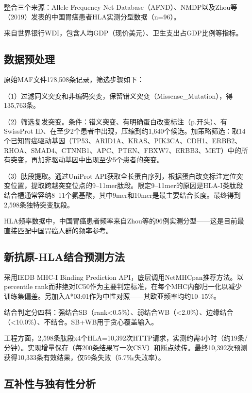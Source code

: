 \documentclass[12pt,a4paper]{ctexart}
\begin{document}
整合三个来源：Allele Frequency Net Database（AFND\cite{ref10}）、NMDP以及Zhou等（2019）\cite{ref9}发表的中国胃癌患者HLA实测分型数据（n=96）。

来自世界银行WDI，包含人均GDP（现价美元）、卫生支出占GDP比例等指标。

\subsection{数据预处理}

原始MAF文件178,508条记录，筛选步骤如下：

（1）过滤同义突变和非编码突变，保留错义突变（Missense\_Mutation），得135,763条。

（2）筛选复发突变。条件：错义突变、有明确蛋白改变标注（p.开头）、有SwissProt ID、在至少2个患者中出现，压缩到约1,640个候选。加策略筛选：取14个已知胃癌驱动基因（TP53、ARID1A、KRAS、PIK3CA、CDH1、ERBB2、RHOA、SMAD4、CTNNB1、APC、PTEN、FBXW7、ERBB3、MET）中的所有突变，再加非驱动基因中出现至少5个患者的突变。

（3）肽段提取。通过UniProt API获取全长蛋白序列，根据蛋白改变标注定位突变位置，提取跨越突变位点的9--11mer肽段。限定9--11mer的原因是HLA-I类肽段结合槽通常容纳8--11个氨基酸，其中9mer和10mer是最主要结合长度。最终得到2,598条独特突变肽段。

HLA频率数据中，中国胃癌患者频率来自Zhou等\cite{ref9}的96例实测分型——这是目前最直接匹配中国胃癌人群的频率参考。

\subsection{新抗原-HLA结合预测方法}

采用IEDB MHC-I Binding Prediction API\cite{ref5}，底层调用NetMHCpan推荐方法\cite{ref6}。以percentile rank而非绝对IC50作为主要判定标准，在每个MHC内部归一化以减少训练集偏差。另加入A*03:01作为中性对照——其欧亚频率均约10--15\%。

结合判定分四档：强结合SB（rank<0.5\%）、弱结合WB（<2.0\%）、边缘结合（<10.0\%）、不结合。SB+WB用于贪心覆盖输入。

工程方面，2,598条肽段x4个HLA=10,392次HTTP请求，实测约需4小时（约19条/分钟）。实现增量保存（每200条结果写一次CSV）和断点续传。最终10,392次预测获得10,333条有效结果，仅59条失败（5.7‰失败率）。

\subsection{互补性与独有性分析}
\end{document}
